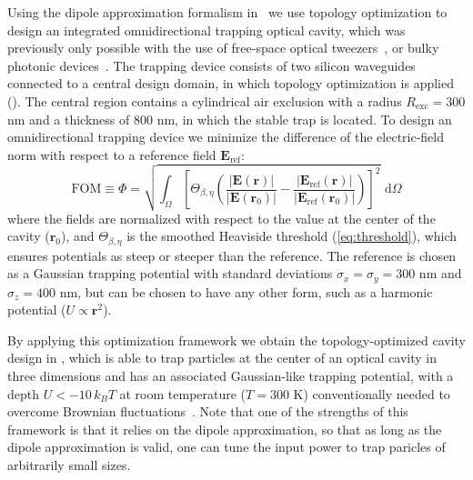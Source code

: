 Using the dipole approximation formalism in~\cite{ownpub1} we use topology optimization to design an integrated omnidirectional trapping optical cavity,
which was previously only possible with the use of free-space optical tweezers~\cite{ashkin_acceleration_1970}, or bulky photonic devices~\cite{manka_simulation_2024}. The trapping device
consists of two silicon waveguides connected to a central design domain, in which
topology optimization is applied (). The central region contains a cylindrical air exclusion with a radius
$R_\text{exc}=300$ nm and a thickness of $800$ nm, in which the stable trap is located.
To design an omnidirectional trapping device we minimize  
the difference of the electric-field norm with respect to a reference field $\mathbf{E}_\text{ref}$:
\begin{equation}
    \text{FOM} \equiv \Phi=\sqrt{\int_{\Omega}\left[\Theta_{\beta,\eta}\left(\frac{|\mathbf{E}(\mathbf{r})|}{\left|\mathbf{E}\left(\mathbf{r}_0\right)\right|}-\frac{\left|\mathbf{E}_{\text{ref}}(\mathbf{r})\right|}{\left|\mathbf{E}_{\text{ref}}\left(\mathbf{r}_0\right)\right|}\right)\right]^2} \text{~d} \Omega
    \end{equation}
where the fields are normalized with respect to the value at the center of the cavity ($\mathbf{r}_0$), and $\Theta_{\beta,\eta}$ is the smoothed Heaviside threshold (\eqref{eq:threshold}), which ensures
potentials as steep or steeper than the reference. The reference is chosen as a Gaussian trapping potential with standard deviations $\sigma_x=\sigma_y=300$ nm and $\sigma_z=400$ nm, but can be chosen to have any other form, such as a harmonic potential ($U\propto\mathbf{r}^2$).

By applying this optimization framework we obtain the topology-optimized cavity design in , which is able to trap particles at the center of an optical
cavity in three dimensions and has an associated Gaussian-like trapping potential, with a depth  $U<-10\, k_B T$ at room temperature ($T=300$ K) conventionally needed to overcome Brownian fluctuations~\cite{novotny}.
Note that one of the strengths of this framework is that it relies on the dipole approximation, so that
as long as the dipole approximation is valid, one can tune the input power to trap paricles of arbitrarily small sizes.

